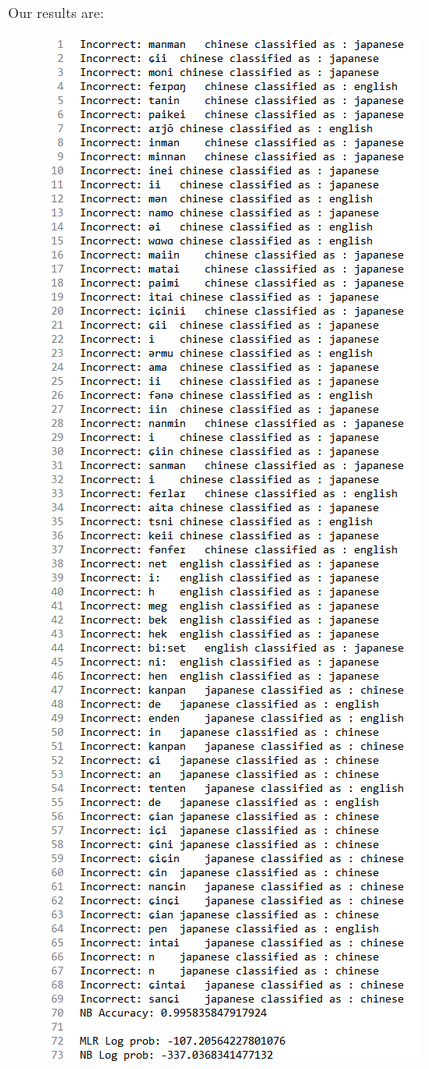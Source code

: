 \documentclass[a4paper]{article}
\begin{document}
Our results are:
\begin{figure}[H]
\centering
\includegraphics[width=\textwidth]{nbresult.png}
\end{figure}
\end{document}
